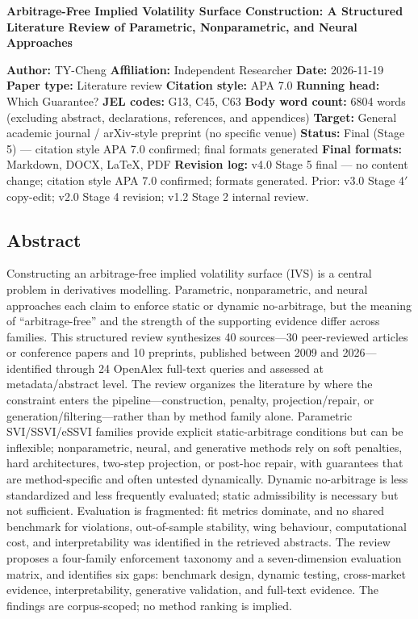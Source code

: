 \documentclass[11pt]{article}
\begin{document}
\begin{center}
{\LARGE\bfseries Arbitrage-Free Implied Volatility Surface Construction: A Structured Literature Review of Parametric, Nonparametric, and Neural Approaches}\\[1.2em]
\end{center}
\textbf{Author:} TY-Cheng \textbf{Affiliation:} Independent Researcher \textbf{Date:} 2026-11-19 \textbf{Paper type:} Literature review \textbf{Citation style:} APA 7.0 \textbf{Running head:} Which Guarantee? \textbf{JEL codes:} G13, C45, C63 \textbf{Body word count:} 6804 words (excluding abstract, declarations, references, and appendices) \textbf{Target:} General academic journal / arXiv-style preprint (no specific venue) \textbf{Status:} Final (Stage 5) — citation style APA 7.0 confirmed; final formats generated \textbf{Final formats:} Markdown, DOCX, LaTeX, PDF \textbf{Revision log:} v4.0 Stage 5 final — no content change; citation style APA 7.0 confirmed; formats generated. Prior: v3.0 Stage 4$'$ copy-edit; v2.0 Stage 4 revision; v1.2 Stage 2 internal review.

\newpage
\subsection*{Abstract}
Constructing an arbitrage-free implied volatility surface (IVS) is a central problem in derivatives modelling. Parametric, nonparametric, and neural approaches each claim to enforce static or dynamic no-arbitrage, but the meaning of “arbitrage-free” and the strength of the supporting evidence differ across families. This structured review synthesizes 40 sources—30 peer-reviewed articles or conference papers and 10 preprints, published between 2009 and 2026—identified through 24 OpenAlex full-text queries and assessed at metadata/abstract level. The review organizes the literature by where the constraint enters the pipeline—construction, penalty, projection/repair, or generation/filtering—rather than by method family alone. Parametric SVI/SSVI/eSSVI families provide explicit static-arbitrage conditions but can be inflexible; nonparametric, neural, and generative methods rely on soft penalties, hard architectures, two-step projection, or post-hoc repair, with guarantees that are method-specific and often untested dynamically. Dynamic no-arbitrage is less standardized and less frequently evaluated; static admissibility is necessary but not sufficient. Evaluation is fragmented: fit metrics dominate, and no shared benchmark for violations, out-of-sample stability, wing behaviour, computational cost, and interpretability was identified in the retrieved abstracts. The review proposes a four-family enforcement taxonomy and a seven-dimension evaluation matrix, and identifies six gaps: benchmark design, dynamic testing, cross-market evidence, interpretability, generative validation, and full-text evidence. The findings are corpus-scoped; no method ranking is implied.
\end{document}
